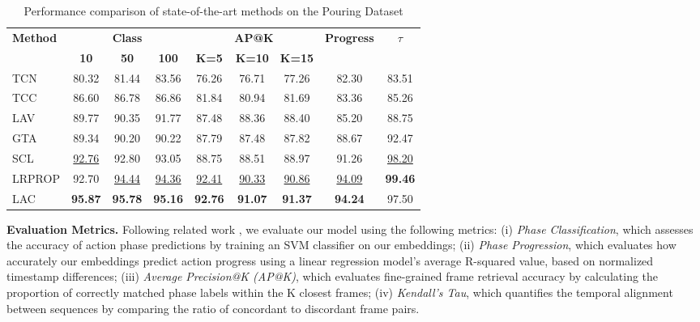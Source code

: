 \begin{table}[]
\small
\centering
\begin{tabularx}{\textwidth}{X|ccc|ccc|c|c}
\multirow{2}{*}{\textbf{Method}} & \multicolumn{3}{c|}{\textbf{Class}} & \multicolumn{3}{c|}{\textbf{AP@K}} & \multirow{2}{*}{\textbf{Progress}} & \multirow{2}{*}{\textbf{$\tau$}} \\ 
\cline{2-7}
 & \textbf{10} & \textbf{50} & \textbf{100} & \textbf{K=5} & \textbf{K=10} & \textbf{K=15} & & \\ 
\hline
\hline
TCN \cite{2017_tcn}        & 80.32 & 81.44 & 83.56 & 76.26 & 76.71 & 77.26 &  82.30 & 83.51 \\
TCC \cite{2019_tcc}        & 86.60 & 86.78 & 86.86 & 81.84 & 80.94 & 81.69 &  83.36 & 85.26 \\
LAV \cite{2021_lav}        & 89.77 & 90.35 & 91.77 & 87.48 & 88.36 & 88.40 &  85.20 & 88.75 \\
GTA \cite{2021_gta}        & 89.34 & 90.20 & 90.22 & 87.79 & 87.48 & 87.82 &  88.67 & 92.47 \\
SCL \cite{2022_carl}       & \underline{92.76} & 92.80 & 93.05 & 88.75 & 88.51 & 88.97 & 91.26 & \underline{98.20} \\
LRPROP \cite{2024_lrprop}  & 92.70 & \underline{94.44} & \underline{94.36} & \underline{92.41} & \underline{90.33} & \underline{90.86} & \underline{94.09} & \textbf{99.46} \\
\hline
LAC & \textbf{95.87} & \textbf{95.78} & \textbf{95.16} & \textbf{92.76} & \textbf{91.07} & \textbf{91.37} & \textbf{94.24} & 97.50 \\
\hline
\hline
\end{tabularx}
\caption{Performance comparison of state-of-the-art methods on the Pouring Dataset \cite{2017_tcn}}
\label{tab: p_class}
\end{table}



\noindent \textbf{Evaluation Metrics.}
Following related work \cite{2019_tcc, 2021_lav, 2021_gta, 2022_carl, 2024_lrprop}, we evaluate our model using the following metrics:
(i) \textit{Phase Classification}, which assesses the accuracy of action phase predictions by training an SVM classifier on our embeddings;
(ii) \textit{Phase Progression}, which evaluates how accurately our embeddings predict action progress using a linear regression model's average R-squared value, based on normalized timestamp differences;
(iii) \textit{Average Precision@K (AP@K)}, which evaluates fine-grained frame retrieval accuracy by calculating the proportion of correctly matched phase labels within the K closest frames;
(iv) \textit{Kendall's Tau}, which quantifies the temporal alignment between sequences by comparing the ratio of concordant to discordant frame pairs.

